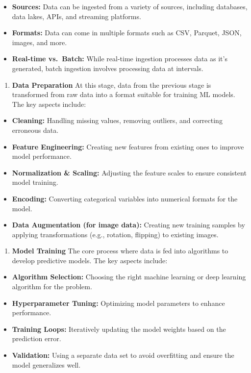 \documentclass[
  letterpaper,
  DIV=11,
  numbers=noendperiod]{scrartcl}
\providecommand{\tightlist}{%
  \setlength{\itemsep}{0pt}\setlength{\parskip}{0pt}}\usepackage{longtable,booktabs,array}
\begin{document}
\begin{itemize}
\tightlist
\item
  \textbf{Sources:} Data can be ingested from a variety of sources,
  including databases, data lakes, APIs, and streaming platforms.
\item
  \textbf{Formats:} Data can come in multiple formats such as CSV,
  Parquet, JSON, images, and more.
\item
  \textbf{Real-time vs.~Batch:} While real-time ingestion processes data
  as it's generated, batch ingestion involves processing data at
  intervals.
\end{itemize}

\begin{enumerate}
\def\labelenumi{\arabic{enumi}.}
\setcounter{enumi}{1}
\tightlist
\item
  \textbf{Data Preparation} At this stage, data from the previous stage
  is transformed from raw data into a format suitable for training ML
  models. The key aspects include:
\end{enumerate}

\begin{itemize}
\tightlist
\item
  \textbf{Cleaning:} Handling missing values, removing outliers, and
  correcting erroneous data.
\item
  \textbf{Feature Engineering:} Creating new features from existing ones
  to improve model performance.
\item
  \textbf{Normalization \& Scaling:} Adjusting the feature scales to
  ensure consistent model training.
\item
  \textbf{Encoding:} Converting categorical variables into numerical
  formats for the model.
\item
  \textbf{Data Augmentation (for image data):} Creating new training
  samples by applying transformations (e.g., rotation, flipping) to
  existing images.
\end{itemize}

\begin{enumerate}
\def\labelenumi{\arabic{enumi}.}
\setcounter{enumi}{2}
\tightlist
\item
  \textbf{Model Training} The core process where data is fed into
  algorithms to develop predictive models. The key aspects include:
\end{enumerate}

\begin{itemize}
\tightlist
\item
  \textbf{Algorithm Selection:} Choosing the right machine learning or
  deep learning algorithm for the problem.
\item
  \textbf{Hyperparameter Tuning:} Optimizing model parameters to enhance
  performance.
\item
  \textbf{Training Loops:} Iteratively updating the model weights based
  on the prediction error.
\item
  \textbf{Validation:} Using a separate data set to avoid overfitting
  and ensure the model generalizes well.
\end{itemize}
\end{document}
